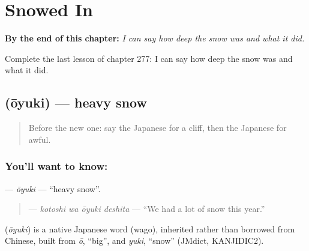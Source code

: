 
\chapter{Snowed In}
\label{ch:ja-snowed-in}

\begin{chapteropening}
\textbf{By the end of this chapter:} \emph{I can say how deep the snow was and what it did.}

Complete the last lesson of chapter 277: I can say how deep the snow was and what it did.
\end{chapteropening}

\section[\texorpdfstring{\ja{おおゆき} (ōyuki)}{おおゆき (ōyuki)}]{ (ōyuki) — heavy snow}

\label{lesson:JA-C277-ouyuki}



\begin{quote}
Before the new one: say the Japanese for a cliff, then the Japanese for awful.
\end{quote}

\subsection*{You'll want to know: }
\textbf{} — \emph{ōyuki} — \textquotedblleft{}heavy snow\textquotedblright{}.

\begin{quote}
\textbf{ } — \emph{kotoshi wa ōyuki deshita} — \textquotedblleft{}We had a lot of snow this year.\textquotedblright{}
\end{quote}

\begin{cousinweb}
\textbf{} (\emph{ōyuki}) is a native Japanese word (wago), inherited rather than borrowed from Chinese, built from \emph{ō}, \textquotedblleft{}big\textquotedblright{}, and \emph{yuki}, \textquotedblleft{}snow\textquotedblright{} (JMdict, KANJIDIC2).
\end{cousinweb}

